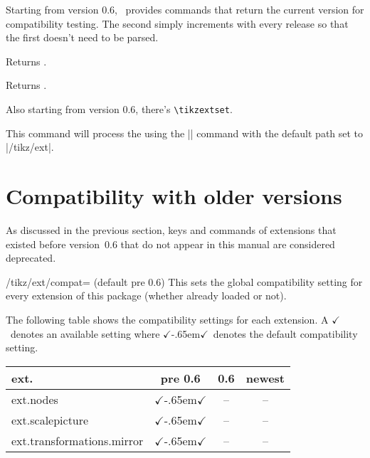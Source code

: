 \begin{multicols}{2}
Starting from version 0.6,
\tikzextname\ provides commands that return the current version for compatibility testing.
The second simply increments with every release
so that the first doesn't need to be parsed.
\begin{command}{\tikzextversion}
  Returns \texttt{\tikzextversion}.
\end{command}
\begin{command}{\tikzextversionnumber}
  Returns \texttt{\tikzextversionnumber}.
\end{command}

Also starting from version 0.6, there's \texttt{\textbackslash tikzextset}.
\begin{command}{\tikzextset{}}
  This command will process the  using the
  |\pgfkeys| command with the default path set to |/tikz/ext|.
\end{command}

\newcolumn
\section{Compatibility with older versions}
As discussed in the previous section,
keys and commands of extensions that existed before version~0.6
that do not appear in this manual are considered deprecated.

\begin{key}{/tikz/ext/compat= (default pre 0.6)}
  This sets the global compatibility setting for every extension of this package
  (whether already loaded or not).

  The following table shows the compatibility settings for each extension.
  \newcommand*\X{$\checkmark$}%
  \newcommand*\Xdef{\X\kern-.65em\X}%
  A \X\ denotes an available setting where \Xdef\ denotes the default compatibility setting.
  \newcommand*\tabHeader[1]{\rotatebox{90}{#1}}
  \begin{center}
  \begin{tabular}{>{\ttfamily ext.}l ccc}
    \toprule
    \multicolumn{1}{l}{Extension} & pre 0.6 & 0.6 & newest \\ \midrule
    nodes                         & \Xdef   & --  &   --   \\
    scalepicture                  & \Xdef   & --  &   --   \\
    transformations.mirror        & \Xdef   & --  &   --   \\ \bottomrule
  \end{tabular}
  \end{center}
\end{key}


\end{multicols}
